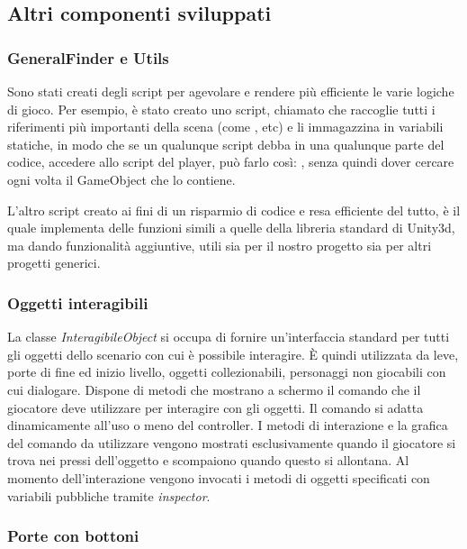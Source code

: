 \subsection{Altri componenti sviluppati}

\subsubsection{GeneralFinder e Utils}

Sono stati creati degli script per agevolare e rendere più efficiente le varie logiche di gioco. Per esempio, è stato creato uno script, chiamato  che raccoglie tutti i riferimenti più importanti della scena (come ,  etc) e li immagazzina in variabili statiche, in modo che se un qualunque script debba in una qualunque parte del codice, accedere allo script del player, può farlo così: , senza quindi dover cercare ogni volta il GameObject che lo contiene.

L'altro script creato ai fini di un risparmio di codice e resa efficiente del tutto, è  il quale implementa delle funzioni simili a quelle della libreria standard di Unity3d, ma dando funzionalità aggiuntive, utili sia per il nostro progetto sia per altri progetti generici.

\subsubsection{Oggetti interagibili}

La classe \textit{InteragibileObject} si occupa di fornire un’interfaccia standard per tutti gli oggetti dello scenario con cui è possibile interagire. È quindi utilizzata da leve, porte di fine ed inizio livello, oggetti collezionabili, personaggi non giocabili con cui dialogare. Dispone di metodi che mostrano a schermo il comando che il giocatore deve utilizzare per interagire con gli oggetti. Il comando si adatta dinamicamente all’uso o meno del controller.
I metodi di interazione e la grafica del comando da utilizzare vengono mostrati esclusivamente quando il giocatore si trova nei pressi dell’oggetto e scompaiono quando questo si allontana.
Al momento dell’interazione vengono invocati i metodi di oggetti specificati con variabili pubbliche tramite \textit{inspector}.

\subsubsection{Porte con bottoni}

